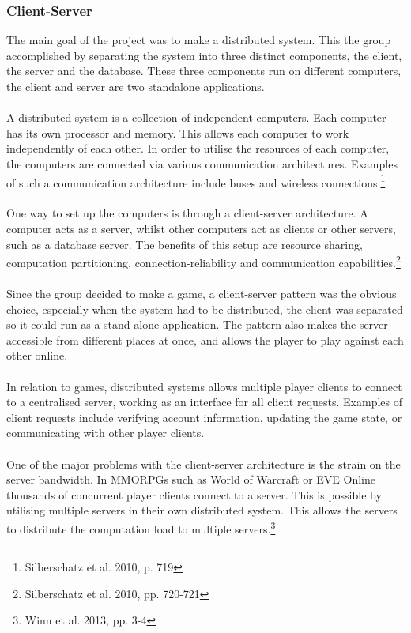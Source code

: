 \subsubsection{Client-Server}
The main goal of the project was to make a distributed system. This the group
accomplished by separating the system into three distinct components, the
client, the server and the database. These three components run on different
 computers, the client and server are two standalone applications.
\\
\\
A distributed system is a collection of independent computers. Each computer
has its own processor and memory. This allows each computer to work
independently of each other. In order to utilise the resources of each
computer, the computers are connected via various communication architectures.
 Examples of such a communication architecture include buses and wireless
  connections.\footnote{Silberschatz et al. 2010, p. 719}
\\
\\
One way to set up the computers is through a client-server architecture. A
computer acts as a server, whilst other computers act as clients or other
servers, such as a database server. The benefits of this setup are resource
sharing, computation partitioning, connection-reliability and communication
capabilities.\footnote{Silberschatz et al. 2010, pp. 720-721}
\\
\\
Since the group decided to make a game, a client-server pattern was the
obvious choice, especially when the system had to be distributed, the client
was separated so it could run as a stand-alone application. The pattern also
makes the server accessible from different places at once, and allows the
player to play against each other online.
\\
\\
In relation to games, distributed systems allows multiple player clients to
connect to a centralised server, working as an interface for all client
requests. Examples of client requests include verifying account information,
updating the game state, or communicating with other player clients.
\\
\\
One of the major problems with the client-server architecture is the strain
on the server bandwidth. In MMORPGs such as World of Warcraft or EVE Online
thousands of concurrent player clients connect to a server. This is possible
by utilising multiple servers in their own distributed system. This allows
the servers to distribute the computation load to multiple
servers.\footnote{Winn et al. 2013, pp. 3-4}
\\
